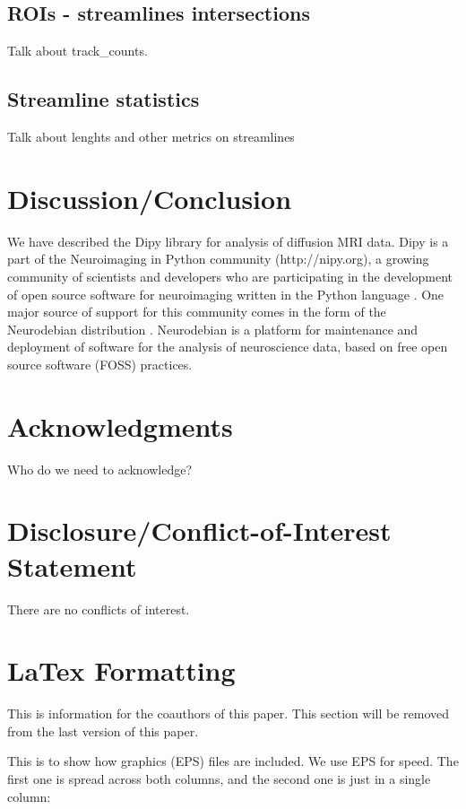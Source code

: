 \documentclass{bioinfo}
\begin{document}
\subsection{ROIs - streamlines intersections}

Talk about track\_counts.

\subsection{Streamline statistics}

Talk about lenghts and other metrics on streamlines

\section{Discussion/Conclusion}

We have described the Dipy library for analysis of diffusion MRI data. Dipy is a part of the Neuroimaging in Python community (http://nipy.org), a growing community of scientists and developers who are participating in the development of open source software for neuroimaging written in the Python language  . One major source of support for this community comes in the form of the Neurodebian distribution \citep{Halchenko2012}. Neurodebian is a platform for maintenance and deployment of software for the analysis of neuroscience data, based on free open source software (FOSS) practices.

\section*{Acknowledgments}
Who do we need to acknowledge?

\section*{Disclosure/Conflict-of-Interest Statement}
There are no conflicts of interest.

\section{LaTex Formatting}

This is information for the coauthors of this paper. This section will be removed from the last version of this paper.

This is to show how graphics (EPS) files are included. We use EPS for
speed. The first one is spread across both columns, and the second one
is just in a single column:
\end{document}
